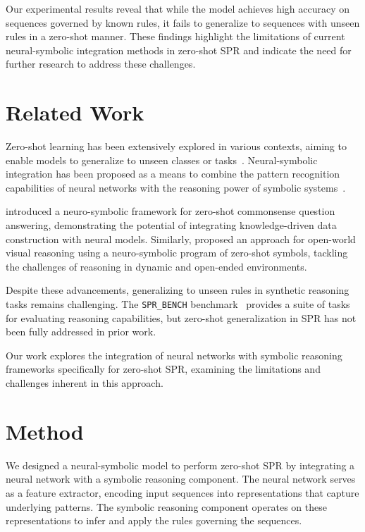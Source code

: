 \documentclass{article} %
\theoremstyle{plain}
\begin{document}
Our experimental results reveal that while the model achieves high accuracy on sequences governed by known rules, it fails to generalize to sequences with unseen rules in a zero-shot manner. These findings highlight the limitations of current neural-symbolic integration methods in zero-shot SPR and indicate the need for further research to address these challenges.

\section{Related Work}
\label{sec:related}

Zero-shot learning has been extensively explored in various contexts, aiming to enable models to generalize to unseen classes or tasks~\citep{snell2017prototypicalnf}. Neural-symbolic integration has been proposed as a means to combine the pattern recognition capabilities of neural networks with the reasoning power of symbolic systems~\citep{hitzler2020neuralsymbolicia}.

\citet{ma2020knowledgedrivendc} introduced a neuro-symbolic framework for zero-shot commonsense question answering, demonstrating the potential of integrating knowledge-driven data construction with neural models. Similarly, \citet{burghouts2024openworldvr} proposed an approach for open-world visual reasoning using a neuro-symbolic program of zero-shot symbols, tackling the challenges of reasoning in dynamic and open-ended environments.

Despite these advancements, generalizing to unseen rules in synthetic reasoning tasks remains challenging. The \texttt{SPR\_BENCH} benchmark~\citep{bortolotti2024anb} provides a suite of tasks for evaluating reasoning capabilities, but zero-shot generalization in SPR has not been fully addressed in prior work.

Our work explores the integration of neural networks with symbolic reasoning frameworks specifically for zero-shot SPR, examining the limitations and challenges inherent in this approach.

\section{Method}
\label{sec:method}

We designed a neural-symbolic model to perform zero-shot SPR by integrating a neural network with a symbolic reasoning component. The neural network serves as a feature extractor, encoding input sequences into representations that capture underlying patterns. The symbolic reasoning component operates on these representations to infer and apply the rules governing the sequences.
\end{document}
